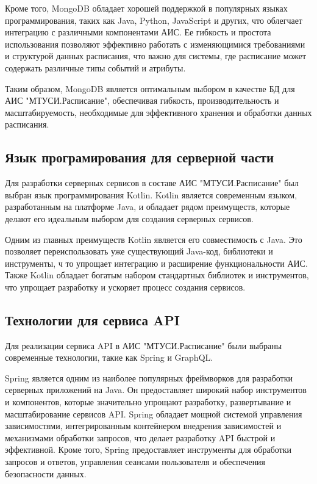 Кроме того, MongoDB обладает хорошей поддержкой в популярных языках программирования,
таких как Java, Python, JavaScript и других, что облегчает интеграцию с различными компонентами АИС.
Ее гибкость и простота использования позволяют эффективно работать с изменяющимися
требованиями и структурой данных расписания, что важно для системы,
где расписание может содержать различные типы событий и атрибуты.

Таким образом, MongoDB является оптимальным выбором в
качестве БД для АИС "МТУСИ.Расписание", обеспечивая гибкость, производительность
и масштабируемость, необходимые для эффективного хранения и обработки данных расписания.

\subsection{Язык програмирования для серверной части}
Для разработки серверных сервисов в составе АИС "МТУСИ.Расписание" был выбран язык программирования Kotlin.
Kotlin является современным языком, разработанным на платформе Java, и обладает рядом преимуществ,
которые делают его идеальным выбором для создания серверных сервисов.

Одним из главных преимуществ Kotlin является его совместимость с Java.
Это позволяет переиспользовать уже существующий Java-код, библиотеки и инструменты, ч
то упрощает интеграцию и расширение функциональности АИС.
Также Kotlin обладает богатым набором стандартных библиотек и инструментов,
что упрощает разработку и ускоряет процесс создания сервисов.

\subsection{Технологии для сервиса API}
Для реализации сервиса API в АИС "МТУСИ.Расписание" были выбраны современные технологии, такие как Spring и GraphQL.

Spring является одним из наиболее популярных фреймворков для разработки серверных приложений на Java.
Он предоставляет широкий набор инструментов и компонентов, которые значительно упрощают разработку,
развертывание и масштабирование сервисов API. Spring обладает мощной системой управления зависимостями,
интегрированным контейнером внедрения зависимостей и механизмами обработки запросов,
что делает разработку API быстрой и эффективной. Кроме того,
Spring предоставляет инструменты для обработки запросов и ответов, управления сеансами пользователя и обеспечения безопасности данных.

